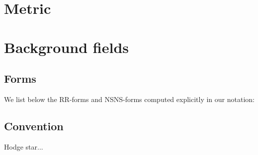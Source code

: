 \appendix
\section{Metric}\label{sec:metric}


\section{Background fields}


\subsection{Forms}
We list below the RR-forms and NSNS-forms computed explicitly in our notation:


\subsection{Convention}
Hodge star...